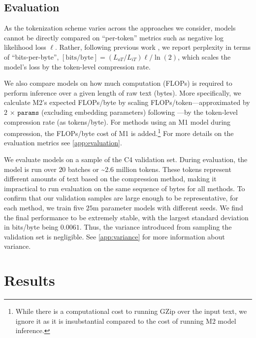 \subsection{Evaluation}
\label{sec:evaluation}

As the tokenization scheme varies across the approaches we consider, models cannot be directly compared on ``per-token'' metrics such as negative log likelihood loss $\ell$. Rather, following previous work \cite[][\textit{et alia}]{dai-etal-2019-transformer, al-rfou-et-al-2019-character, choe-et-al-2019-bridging, gaoPile800GBDataset2020}, we report perplexity in terms of ``bits-per-byte'', $[\text{bits/byte}]=(L_{oT}/L_{iT})\ell/\ln(2)$, which scales the model's loss by the token-level compression rate.

We also compare models on how much computation (FLOPs) is required to perform inference over a given length of raw text (bytes). More specifically, we calculate M2's expected FLOPs/byte by scaling FLOPs/token---approximated by $2\,\times\,\texttt{params}$ (excluding embedding parameters) following \citet{kaplanScalingLawsNeural2020}---by the token-level compression rate (as tokens/byte). For methods using an M1 model during compression, the FLOPs/byte cost of M1 is added.\footnote{While there is a computational cost to running GZip over the input text, we ignore it as it is insubstantial compared to the cost of running M2 model inference.} For more details on the evaluation metrics see \ref{app:evaluation}.

We evaluate models on a sample of the C4 validation set. During evaluation, the model is run over $20$ batches or \textasciitilde{}$2.6$ million tokens. These tokens represent different amounts of text based on the compression method, making it impractical to run evaluation on the same sequence of bytes for all methods. To confirm that our validation samples are large enough to be representative, for each method, we train five $25$m parameter models with different seeds. We find the final performance to be extremely stable, with the largest standard deviation in bits/byte being $0.0061$. Thus, the variance introduced from sampling the validation set is negligible. See \ref{app:variance} for more information about variance.

\section{Results}
\label{sec:results}

